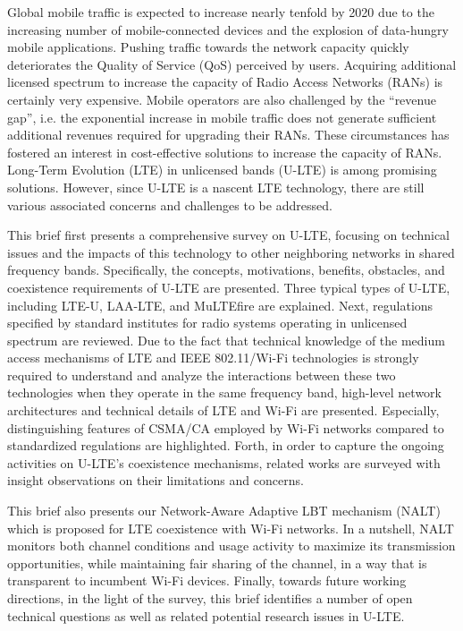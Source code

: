 %
%

\preface

Global mobile traffic is expected to increase nearly tenfold by 2020 due to the increasing number of mobile-connected devices and the explosion of data-hungry mobile applications. Pushing traffic towards the network capacity quickly deteriorates the Quality of Service (QoS) perceived by users. Acquiring additional licensed spectrum to increase the capacity of Radio Access Networks (RANs) is certainly very expensive. Mobile operators are also challenged by the “revenue gap”, i.e. the exponential increase in mobile traffic does not generate sufficient additional revenues required for upgrading their RANs. These circumstances has fostered an interest in cost-effective solutions to increase the capacity of RANs. Long-Term Evolution (LTE) in unlicensed bands (U-LTE) is among promising solutions. However, since U-LTE is a nascent LTE technology, there are still various associated concerns and challenges to be addressed.

This brief first presents a comprehensive survey on U-LTE, focusing on technical issues and the impacts of this technology to other neighboring networks in shared frequency bands. Specifically, the concepts, motivations, benefits, obstacles, and coexistence requirements of U-LTE are presented. Three typical types of U-LTE, including LTE-U, LAA-LTE, and MuLTEfire are explained. Next, regulations specified by standard institutes for radio systems operating in unlicensed spectrum are reviewed. Due to the fact that technical knowledge of the medium access mechanisms of LTE and IEEE 802.11/Wi-Fi technologies is strongly required to understand and analyze the interactions between these two technologies when they operate in the same frequency band, high-level network architectures and technical details of LTE and Wi-Fi are presented. Especially, distinguishing features of CSMA/CA employed by Wi-Fi networks compared to standardized regulations are highlighted. Forth, in order to capture the ongoing activities on U-LTE’s coexistence mechanisms, related works are surveyed with insight observations on their limitations and concerns. 

This brief also presents our Network-Aware Adaptive LBT mechanism (NALT) which is proposed for LTE coexistence with Wi-Fi networks. In a nutshell, NALT monitors both channel conditions and usage activity to maximize its transmission opportunities, while maintaining fair sharing of the channel, in a way that is transparent to incumbent Wi-Fi devices. Finally, towards future working directions, in the light of the survey, this brief identifies a number of open technical questions as well as related potential research issues in U-LTE.

